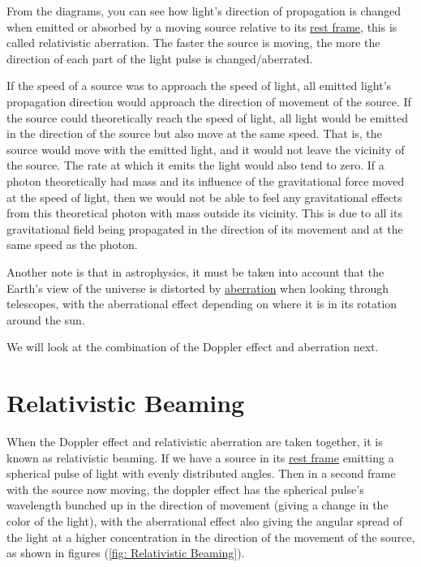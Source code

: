From the diagrams, you can see how light's direction of propagation is changed when emitted or absorbed by a moving source relative to its \hyperlink{def-proper-frame}{rest frame}, this is called relativistic aberration. The faster the source is moving, the more the direction of each part of the light pulse is changed/aberrated.


If the speed of a source was to approach the speed of light, all emitted light's propagation direction would approach the direction of movement of the source.
If the source could theoretically reach the speed of light, all light would be emitted in the direction of the source but also move at the same speed.
That is, the source would move with the emitted light, and it would not leave the vicinity of the source.
The rate at which it emits the light would also tend to zero.
If a photon theoretically had mass and its influence of the gravitational force moved at the speed of light, then we would not be able to feel any gravitational effects from this theoretical photon with mass outside its vicinity.
This is due to all its gravitational field being propagated in the direction of its movement and at the same speed as the photon.

Another note is that in astrophysics, it must be taken into account that the Earth's view of the universe is distorted by \hyperlink{def-aberration}{aberration} when looking through telescopes, with the aberrational effect depending on where it is in its rotation around the sun.

We will look at the combination of the Doppler effect and aberration next.


\section{Relativistic Beaming} \label{sect: Intro Relativistic Beaming}

When the Doppler effect and relativistic aberration are taken together, it is known as relativistic beaming.
If we have a source in its \hyperlink{def-proper-frame}{rest frame} emitting a spherical pulse of light with evenly distributed angles.
Then in a second frame with the source now moving, the doppler effect has the spherical pulse's wavelength bunched up in the direction of movement (giving a change in the color of the light), with the aberrational effect also giving the angular spread of the light at a higher concentration in the direction of the movement of the source, as shown in figures (\ref{fig: Relativistic Beaming}).

